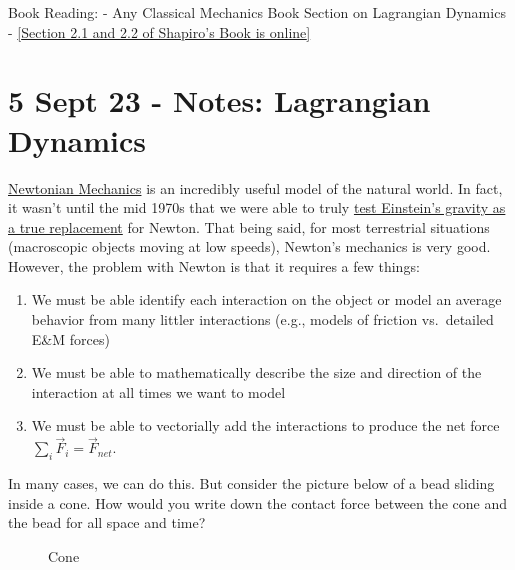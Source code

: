 Book Reading: - Any Classical Mechanics Book Section on Lagrangian
Dynamics -
\href{https://www.physics.rutgers.edu/~shapiro/507/book.pdf}{{[}Section
2.1 and 2.2 of Shapiro's Book is online{]}}

\section{5 Sept 23 - Notes: Lagrangian
Dynamics}\label{sept-23---notes-lagrangian-dynamics}

\href{https://en.wikipedia.org/wiki/Newton\%27s_laws_of_motion}{Newtonian
Mechanics} is an incredibly useful model of the natural world. In fact,
it wasn't until the mid 1970s that we were able to truly
\href{https://en.wikipedia.org/wiki/Tests_of_general_relativity}{test
Einstein's gravity as a true replacement} for Newton. That being said,
for most terrestrial situations (macroscopic objects moving at low
speeds), Newton's mechanics is very good. However, the problem with
Newton is that it requires a few things:

\begin{enumerate}
\def\labelenumi{\arabic{enumi}.}
\tightlist
\item
  We must be able identify each interaction on the object or model an
  average behavior from many littler interactions (e.g., models of
  friction vs.~detailed E\&M forces)
\item
  We must be able to mathematically describe the size and direction of
  the interaction at all times we want to model
\item
  We must be able to vectorially add the interactions to produce the net
  force \(\sum_i \vec{F}_i = \vec{F}_{net}\).
\end{enumerate}

In many cases, we can do this. But consider the picture below of a bead
sliding inside a cone. How would you write down the contact force
between the cone and the bead for all space and time?

\begin{figure}
\centering
{}
\caption{Cone}
\end{figure}

